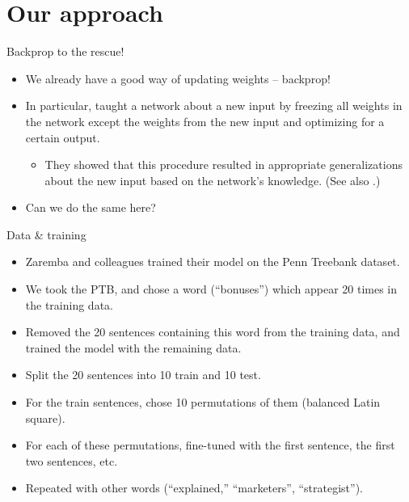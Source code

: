 \documentclass{beamer}
\begin{document}
\section{Our approach}
\begin{frame}{Backprop to the rescue!}
\begin{itemize}
    \item<1-> We already have a good way of updating weights -- backprop!
    \item<2-> In particular, \citet{Rumelhart1993} taught a network about a new input by freezing all weights in the network except the weights from the new input and optimizing for a certain output.
    \begin{itemize}
	\item<3-> They showed that this procedure resulted in appropriate generalizations about the new input based on the network's knowledge. (See also \citet{Rogers2004}.)
    \end{itemize} 
    \item<4-> Can we do the same here?
\end{itemize}
\end{frame}


\begin{frame}{Data \& training}
\begin{itemize}
    \item<1-> Zaremba and colleagues trained their model on the Penn Treebank dataset. 
    \item<2-> We took the PTB, and chose a word (``bonuses'') which appear 20 times in the training data. 
    \item<3-> Removed the 20 sentences containing this word from the training data, and trained the model with the remaining data.
    \item<4-> Split the 20 sentences into 10 train and 10 test.
    \item<5-> For the train sentences, chose 10 permutations of them (balanced Latin square).
    \item<6-> For each of these permutations, fine-tuned with the first sentence, the first two sentences, etc. 
    \item<7-> Repeated with other words (``explained,'' ``marketers'', ``strategist'').
\end{itemize}
\end{frame}
\end{document}
